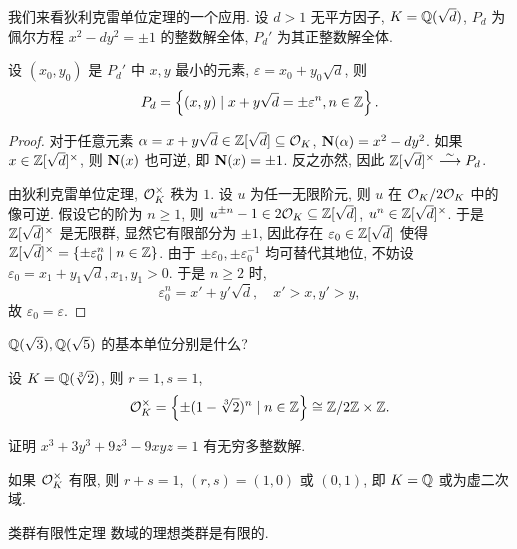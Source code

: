 我们来看狄利克雷单位定理的一个应用. 设 $d>1$ 无平方因子, $K={\mathbb{Q}}(\sqrt{d})$, $P_d$ 为佩尔方程 $x^2-dy^2=\pm 1$ 的整数解全体, $P_d'$ 为其正整数解全体.

\begin{corollary}{}{}
	设 $(x_0,y_0)$ 是 $P_d'$ 中 $x,y$ 最小的元素, $\varepsilon=x_0+y_0\sqrt{d}$, 则
	\[P_d=\left\{(x,y)\mid x+y\sqrt{d}=\pm\varepsilon^n, n\in{\mathbb{Z}}\right\}.\]
\end{corollary}

\begin{proof}
	对于任意元素 $\alpha=x+y\sqrt{d}\in {\mathbb{Z}}[\sqrt{d}]\subseteq {\mathcal{O}}_K$, ${\mathbf{N}}(\alpha)=x^2-dy^2$. 如果 $x\in{\mathbb{Z}}[\sqrt{d}]^\times$, 则 ${\mathbf{N}}(x)$ 也可逆, 即 ${\mathbf{N}}(x)=\pm 1$. 反之亦然, 因此 ${\mathbb{Z}}[\sqrt{d}]^\times\stackrel{\sim}{\longrightarrow} P_d$.

	由狄利克雷单位定理, ${\mathcal{O}}_K^\times$ 秩为 $1$. 设 $u$ 为任一无限阶元, 则 $u$ 在 ${\mathcal{O}}_K/2{\mathcal{O}}_K$ 中的像可逆. 假设它的阶为 $n\ge 1$, 则 $u^{\pm n}-1\in 2{\mathcal{O}}_K\subseteq {\mathbb{Z}}[\sqrt{d}]$, $u^n\in {\mathbb{Z}}[\sqrt{d}]^\times$. 于是 ${\mathbb{Z}}[\sqrt{d}]^\times$ 是无限群, 显然它有限部分为 $\pm 1$, 因此存在 $\varepsilon_0\in{\mathbb{Z}}[\sqrt{d}]$ 使得 ${\mathbb{Z}}[\sqrt{d}]^\times=\left\{\pm\varepsilon_0^n\mid n\in{\mathbb{Z}}\right\}$. 由于 $\pm \varepsilon_0,\pm \varepsilon_0^{-1}$ 均可替代其地位, 不妨设 $\varepsilon_0=x_1+y_1\sqrt{d},x_1,y_1>0$. 于是 $n\ge 2$ 时,
	\[\varepsilon_0^n=x'+y'\sqrt{d},\quad x'>x,y'>y,\]
	故 $\varepsilon_0=\varepsilon$.
\end{proof}

\begin{exercise}
	${\mathbb{Q}}(\sqrt{3}), {\mathbb{Q}}(\sqrt{5})$ 的基本单位分别是什么?
\end{exercise}

\begin{example}
	设 $K={\mathbb{Q}}(\sqrt[3]2)$, 则 $r=1,s=1$,
	\[{\mathcal{O}}_K^\times=\left\{\pm(1-\sqrt[3]2)^n\mid n\in{\mathbb{Z}}\right\}\cong{\mathbb{Z}}/2{\mathbb{Z}}\times {\mathbb{Z}}.\]
\end{example}

\begin{exercise}
	证明 $x^3+3y^3+9z^3-9xyz=1$ 有无穷多整数解.
\end{exercise}

\begin{example}
	如果 ${\mathcal{O}}_K^\times$ 有限, 则 $r+s=1$, $(r,s)=(1,0)$ 或 $(0,1)$, 即 $K={\mathbb{Q}}$ 或为虚二次域.
\end{example}

\begin{theorem}{类群有限性定理}{}
	数域的理想类群是有限的.
\end{theorem}

